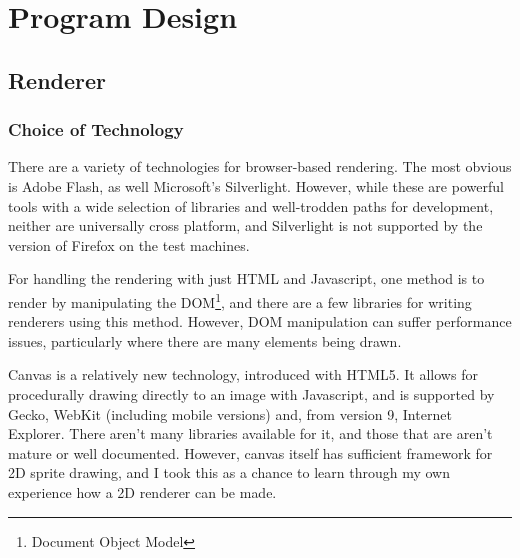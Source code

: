 \documentclass[12pt]{amsart}
\begin{document}
\section{Program Design}
  \subsection{Renderer}
    \subsubsection{Choice of Technology}
      \begin{flushleft}
        There are a variety of technologies for browser-based rendering. The
        most obvious is Adobe Flash, as well Microsoft's Silverlight. However,
        while these are powerful tools with a wide selection of libraries and
        well-trodden paths for development, neither are universally cross
        platform, and Silverlight is not supported by the version of Firefox
        on the test machines.

        For handling the rendering with just HTML and Javascript, one method is
        to render by manipulating the DOM\footnote{Document Object Model}, and
        there are a few libraries for writing renderers using this method.
        However, DOM manipulation can suffer performance issues, particularly
        where there are many elements being drawn.

        Canvas is a relatively new technology, introduced with HTML5. It allows
        for procedurally drawing directly to an image with Javascript, and is
        supported by Gecko, WebKit (including mobile versions) and, from version
        9, Internet Explorer. There aren't many libraries available for it, and
        those that are aren't mature or well documented. However, canvas itself
        has sufficient framework for 2D sprite drawing, and I took this as a
        chance to learn through my own experience how a 2D renderer can be made.
      \end{flushleft}
\end{document}
